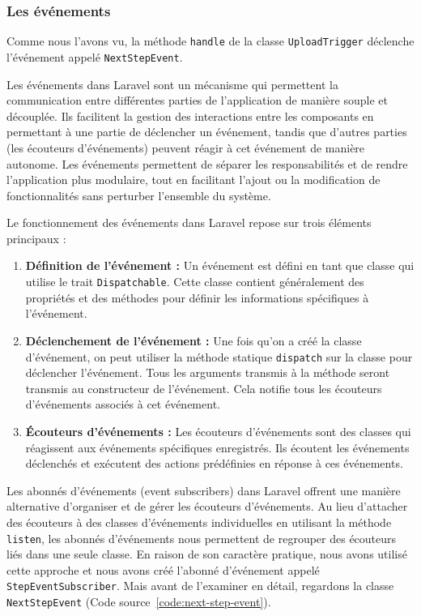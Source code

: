 \subsubsection{Les événements}

Comme nous l'avons vu, la méthode \Verb|handle| de la classe \Verb|UploadTrigger| déclenche l'événement appelé \Verb|NextStepEvent|.

Les événements dans Laravel sont un mécanisme qui permettent la communication entre différentes parties de l'application de manière souple et découplée. Ils facilitent la gestion des interactions entre les composants en permettant à une partie de déclencher un événement, tandis que d'autres parties (les écouteurs d'événements) peuvent réagir à cet événement de manière autonome. Les événements permettent de séparer les responsabilités et de rendre l'application plus modulaire, tout en facilitant l'ajout ou la modification de fonctionnalités sans perturber l'ensemble du système.

Le fonctionnement des événements dans Laravel repose sur trois éléments principaux :

\begin{enumerate}
    \item \textbf{Définition de l'événement :} Un événement est défini en tant que classe qui utilise le trait \Verb|Dispatchable|. Cette classe contient généralement des propriétés et des méthodes pour définir les informations spécifiques à l'événement.
    \item \textbf{Déclenchement de l'événement :} Une fois qu'on a créé la classe d'événement, on peut utiliser la méthode statique \Verb|dispatch| sur la classe pour déclencher l'événement. Tous les arguments transmis à la méthode seront transmis au constructeur de l'événement. Cela notifie tous les écouteurs d'événements associés à cet événement.
    \item \textbf{Écouteurs d'événements :} Les écouteurs d'événements sont des classes qui réagissent aux événements spécifiques enregistrés. Ils écoutent les événements déclenchés et exécutent des actions prédéfinies en réponse à ces événements.
\end{enumerate}

Les abonnés d'événements (event subscribers) dans Laravel offrent une manière alternative d'organiser et de gérer les écouteurs d'événements. Au lieu d'attacher des écouteurs à des classes d'événements individuelles en utilisant la méthode \Verb|listen|, les abonnés d'événements nous permettent de regrouper des écouteurs liés dans une seule classe. En raison de son caractère pratique, nous avons utilisé cette approche et nous avons créé l'abonné d'événement appelé \Verb|StepEventSubscriber|. Mais avant de l'examiner en détail, regardons la classe \Verb|NextStepEvent| (Code source~\ref{code:next-step-event}).

